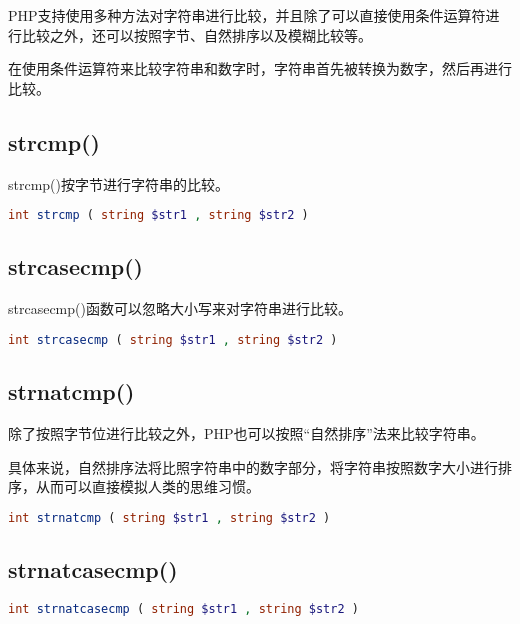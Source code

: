 PHP支持使用多种方法对字符串进行比较，并且除了可以直接使用条件运算符进行比较之外，还可以按照字节、自然排序以及模糊比较等。

在使用条件运算符来比较字符串和数字时，字符串首先被转换为数字，然后再进行比较。

\subsection{strcmp()}

strcmp()按字节进行字符串的比较。


\begin{lstlisting}[language=PHP]
int strcmp ( string $str1 , string $str2 )
\end{lstlisting}

\subsection{strcasecmp()}

strcasecmp()函数可以忽略大小写来对字符串进行比较。


\begin{lstlisting}[language=PHP]
int strcasecmp ( string $str1 , string $str2 )
\end{lstlisting}

\subsection{strnatcmp()}

除了按照字节位进行比较之外，PHP也可以按照“自然排序”法来比较字符串。

具体来说，自然排序法将比照字符串中的数字部分，将字符串按照数字大小进行排序，从而可以直接模拟人类的思维习惯。





\begin{lstlisting}[language=PHP]
int strnatcmp ( string $str1 , string $str2 )
\end{lstlisting}

\subsection{strnatcasecmp()}





\begin{lstlisting}[language=PHP]
int strnatcasecmp ( string $str1 , string $str2 )
\end{lstlisting}



